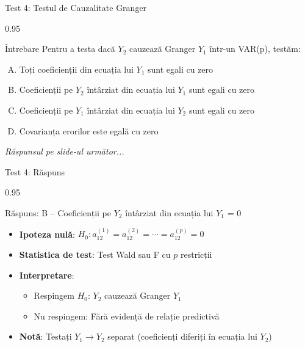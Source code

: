 \documentclass[9pt, aspectratio=169, t]{beamer}
\begin{document}
\begin{frame}{Test 4: Testul de Cauzalitate Granger}
    \begin{cminipage}{0.95\textwidth}
    \begin{alertblock}{Întrebare}
        Pentru a testa dacă $Y_2$ cauzează Granger $Y_1$ într-un VAR(p), testăm:
    \end{alertblock}

    \vspace{0.3cm}

    \begin{enumerate}[A)]\setlength{\itemsep}{0pt}
        \item Toți coeficienții din ecuația lui $Y_1$ sunt egali cu zero
        \item Coeficienții pe $Y_2$ întârziat din ecuația lui $Y_1$ sunt egali cu zero
        \item Coeficienții pe $Y_1$ întârziat din ecuația lui $Y_2$ sunt egali cu zero
        \item Covarianța erorilor este egală cu zero
    \end{enumerate}

    \vspace{0.5cm}
    \begin{flushright}\textit{Răspunsul pe slide-ul următor...}\end{flushright}
    \end{cminipage}
\end{frame}

\begin{frame}{Test 4: Răspuns}
    \begin{cminipage}{0.95\textwidth}
    \begin{exampleblock}{Răspuns: B -- Coeficienții pe $Y_2$ întârziat din ecuația lui $Y_1$ = 0}
        \begin{itemize}\setlength{\itemsep}{0pt}
            \item \textbf{Ipoteza nulă}: $H_0: a_{12}^{(1)} = a_{12}^{(2)} = \cdots = a_{12}^{(p)} = 0$
            \item \textbf{Statistica de test}: Test Wald sau F cu $p$ restricții
            \item \textbf{Interpretare}:
            \begin{itemize}\setlength{\itemsep}{0pt}
                \item Respingem $H_0$: $Y_2$ cauzează Granger $Y_1$
                \item Nu respingem: Fără evidență de relație predictivă
            \end{itemize}
            \item \textbf{Notă}: Testați $Y_1 \to Y_2$ separat (coeficienți diferiți în ecuația lui $Y_2$)
        \end{itemize}
    \end{exampleblock}
    \end{cminipage}
\end{frame}
\end{document}
